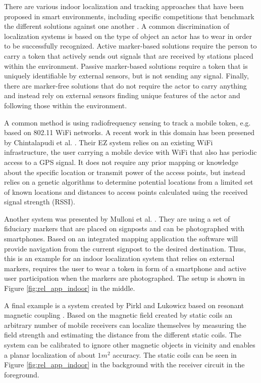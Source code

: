 There are various indoor localization and tracking approaches that have been proposed in smart environments, including specific competitions that benchmark the different solutions against one another \cite{chessa_eval}. A common discrimination of localization systems is based on the type of object an actor has to wear in order to be successfully recognized. Active marker-based solutions require the person to carry a token that actively sends out signals that are received by stations placed within the environment. Passive marker-based solutions require a token that is uniquely identifiable by external sensors, but is not sending any signal. Finally, there are marker-free solutions that do not require the actor to carry anything and instead rely on external sensors finding unique features of the actor and following those within the environment. 

A common method is using radiofrequency sensing to track a mobile token, e.g. based on 802.11 WiFi networks. A recent work in this domain has been presened by Chintalapudi et al. \cite{chintalapudi2010indoor}. Their EZ system relies on an existing WiFi infrastructure, the user carrying a mobile device with WiFi that also has periodic access to a GPS signal. It does not require any prior mapping or knowledge about the specific location or transmit power of the access points, but instead relies on a genetic algorithms to determine potential locations from a limited set of known locations and distances to access points calculated using the received signal strength (RSSI). 

Another system was presented by Mulloni et al. \cite{mulloni2009indoor}. They are using a set of fiduciary markers that are placed on signposts and can be photographed with smartphones. Based on an integrated mapping application the software will provide navigation from the current signpost to the desired destination. Thus, this is an example for an indoor localization system that relies on external markers, requires the user to wear a token in form of a smartphone and active user participation when the markers are photographed. The setup is shown in Figure \ref{fig:rel_app_indoor} in the middle.

A final example is a system created by Pirkl and Lukowicz based on resonant magnetic coupling \cite{pirkl2013resonant}. Based on the magnetic field created by static coils an arbitrary number of mobile receivers can localize themselves by measuring the field strength and estimating the distance from the different static coils. The system can be calibrated to ignore other magnetic objects in vicinity and enables a planar localization of about $1m^2$ accuracy. The static coils can be seen in Figure \ref{fig:rel_app_indoor} in the background with the receiver circuit in the foreground.

